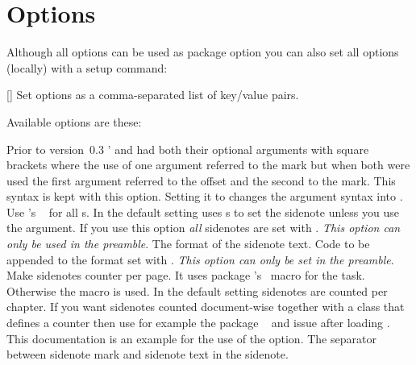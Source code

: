 \documentclass[load-preamble+]{cnltx-doc}
\begin{document}
\section{Options}\label{sec:options}
Although all options can be used as package option you can also set all options
(locally) with a setup command:
\begin{commands}
  []
    Set options as a comma-separated list of key/value pairs.
\end{commands}
Available options are these:
\begin{options}
  \label{key:dblarg}%
    Prior to version~0.3 \snotez'  and  had both
    their optional arguments with square brackets where the use of one argument
    referred to the mark but when both were used the first argument referred
    to the offset and the second to the mark.  This syntax is kept with this
    option.  Setting it to  changes the  argument
    syntax into .
    Use 's ~\cite{pkg:marginnote} for all
    s.  In the default setting  uses
    s to set the sidenote unless you use the 
    argument.  If you use this option \emph{all} sidenotes are set with
    .  \emph{This option can only be used in the preamble}.
    The format of the sidenote text.
  \Default
    Code to be appended to the format set with
    .
    \emph{This option can only be set in the preamble}.  Make sidenotes
    counter per page.  It uses package 's~\cite{pkg:perpage}
     macro for the task.  Otherwise the macro
     is used.  In the default setting sidenotes are counted 
    per chapter.  If you want sidenotes counted document-wise together with a
    class that defines a counter  then use for example the
    package ~\cite{pkg:chngcntr} and issue
     after loading \snotez.
    This documentation is an example for the use of the option.
    The separator between sidenote mark and sidenote text in the sidenote.

\end{options}
\end{document}

